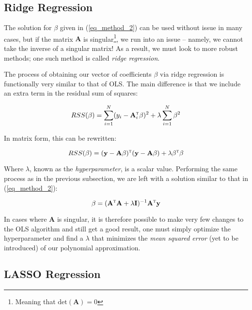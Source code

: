 \documentclass[a4paper,10pt,english]{article}
\begin{document}
	\subsection*{Ridge Regression}
	
	The solution for $\beta$ given in (\ref{eq_method_2}) can be used without issue in many cases, but if the matrix $\mathbf{A}$ is singular\footnote{Meaning that $\text{det}(\mathbf{A}) = 0$}, we run into an issue – namely, we cannot take the inverse of a singular matrix!  As a result, we must look to more robust methods; one such method is called \textit{ridge regression}.  
	
	The process of obtaining our vector of coefficients $\beta$ via ridge regression is functionally very similar to that of OLS.  The main difference is that we include an extra term in the residual sum of squares:

	\begin{equation*}
	RSS(\beta) = \sum_{i=1}^N (y_i - \mathbf{A}_i^\textsc{t} \beta)^2 + \lambda \sum_{i=1}^N \beta^2
	\end{equation*}
	
	In matrix form, this can be rewritten:	
	
	\begin{equation*}
	RSS(\beta) = (\mathbf{y} - \mathbf{A} \beta)^\textsc{t}(\mathbf{y} - \mathbf{A} \beta) + \lambda \beta^\textsc{t} \beta
	\end{equation*}
	
	Where $\lambda$, known as the \textit{hyperparameter}, is a scalar value. Performing the same process as in the previous subsection, we are left with a solution similar to that in (\ref{eq_method_2}):
	
	\begin{equation}
	\label{eq_method_3}
	\beta = (\mathbf{A}^\textsc{t} \mathbf{A} + \lambda \mathbf{I}) ^{-1} \mathbf{A}^\textsc{t} \mathbf{y}
	\end{equation}
	
	In cases where $\mathbf{A}$ is singular, it is therefore possible to make very few changes to the OLS algorithm and still get a good result, one must simply optimize the hyperparameter and find a $\lambda$ that minimizes the \textit{mean squared error} (yet to be introduced) of our polynomial approximation.
	
	\subsection*{LASSO Regression}
	
\end{document}
